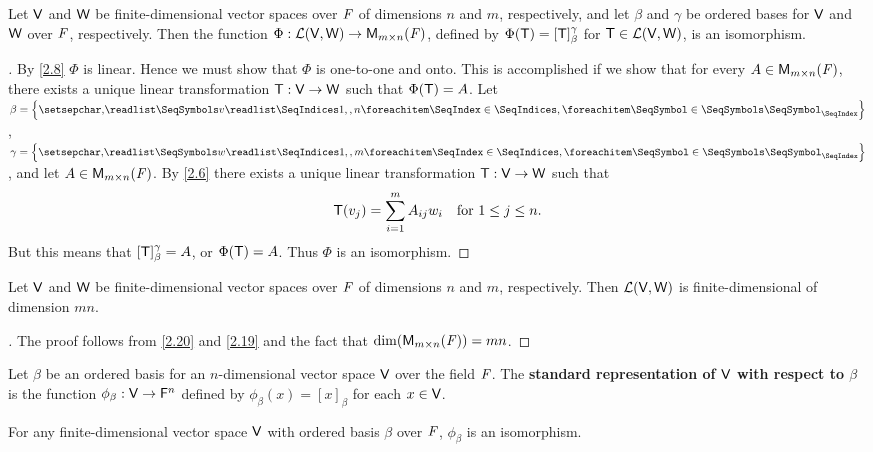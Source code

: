 \begin{thm}\label{2.20}
  Let \(\mathsf{V}\) and \(\mathsf{W}\) be finite-dimensional vector spaces over \(\mathit{F}\) of dimensions \(n\) and \(m\), respectively, and let \(\beta\) and \(\gamma\) be ordered bases for \(\mathsf{V}\) and \(\mathsf{W}\) over \(\mathit{F}\), respectively.
  Then the function \(\Phi : \mathcal{L}(\mathsf{V}, \mathsf{W}) \to \mathsf{M}_{{m} \times n}({\mathit{F}})\), defined by \(\Phi(\mathsf{T}) = [\mathsf{T}]_{\beta}^{\gamma}\) for \(\mathsf{T} \in \mathcal{L}(\mathsf{V}, \mathsf{W})\), is an isomorphism.
\end{thm}

\begin{proof}[]
  By \cref{2.8} \(\Phi\) is linear.
  Hence we must show that \(\Phi\) is one-to-one and onto.
  This is accomplished if we show that for every \(A \in \mathsf{M}_{{m} \times n}({\mathit{F}})\), there exists a unique linear transformation \(\mathsf{T} : \mathsf{V} \to \mathsf{W}\) such that \(\Phi(\mathsf{T}) = A\).
  Let \(\beta = \set{\seq{v}{1,,n}}\), \(\gamma = \set{\seq{w}{1,,m}}\), and let \(A \in \mathsf{M}_{{m} \times n}({\mathit{F}})\).
  By \cref{2.6} there exists a unique linear transformation \(\mathsf{T} : \mathsf{V} \to \mathsf{W}\) such that
  \[
    \mathsf{T}(v_j) = \sum_{i = 1}^m A_{i j} w_i \quad \text{for } 1 \leq j \leq n.
  \]
  But this means that \([\mathsf{T}]_{\beta}^{\gamma} = A\), or \(\Phi(\mathsf{T}) = A\).
  Thus \(\Phi\) is an isomorphism.
\end{proof}

\begin{cor}\label{2.4.10}
  Let \(\mathsf{V}\) and \(\mathsf{W}\) be finite-dimensional vector spaces over \(\mathit{F}\) of dimensions \(n\) and \(m\), respectively.
  Then \(\mathcal{L}(\mathsf{V}, \mathsf{W})\) is finite-dimensional of dimension \(mn\).
\end{cor}

\begin{proof}[]
  The proof follows from \cref{2.20} and \cref{2.19} and the fact that \(\dim(\mathsf{M}_{{m} \times n}({\mathit{F}})) = mn\).
\end{proof}

\begin{defn}\label{2.4.11}
  Let \(\beta\) be an ordered basis for an \(n\)-dimensional vector space \(\mathsf{V}\) over the field \(\mathit{F}\).
  The \textbf{standard representation of \(\mathsf{V}\) with respect to \(\beta\)} is the function \(\phi_{\beta} : \mathsf{V} \to \mathsf{F}^n\) defined by \(\phi_{\beta}(x) = [x]_{\beta}\) for each \(x \in \mathsf{V}\).
\end{defn}

\begin{thm}\label{2.21}
  For any finite-dimensional vector space \(\mathsf{V}\) with ordered basis \(\beta\) over \(\mathit{F}\), \(\phi_{\beta}\) is an isomorphism.
\end{thm}

